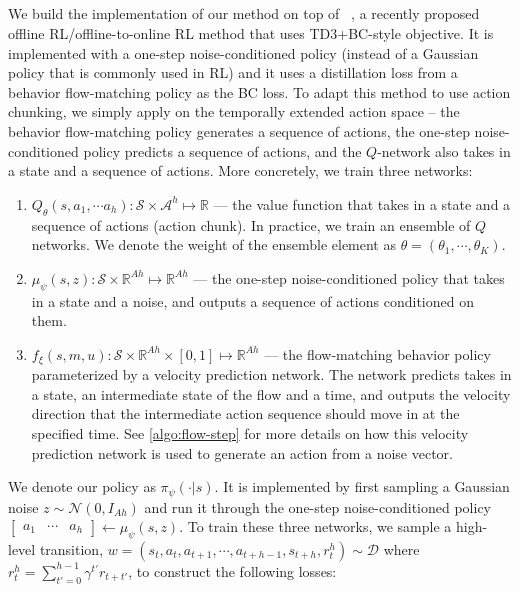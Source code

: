 \subsection{}
We build the implementation of our method on top of ~\citep{park2025flow}, a recently proposed offline RL/offline-to-online RL method that uses TD3+BC-style objective. It is implemented with a one-step noise-conditioned policy (instead of a Gaussian policy that is commonly used in RL) and it uses a distillation loss from a behavior flow-matching policy as the BC loss. To adapt this method to use action chunking, we simply apply  on the temporally extended action space -- the behavior flow-matching policy generates a sequence of actions, the one-step noise-conditioned policy predicts a sequence of actions, and the $Q$-network also takes in a state and a sequence of actions. More concretely, we train three networks:
\begin{enumerate}
    \item $Q_\theta(s, a_1, \cdots a_h): \mathcal{S}\times \mathcal{A}^h \mapsto \mathbb{R}$ --- the value function that takes in a state and a sequence of actions (action chunk). In practice, we train an ensemble of $Q$ networks. We denote the weight of the ensemble element as $\theta = (\theta_1, \cdots, \theta_K)$.
    \item $\mu_\psi(s, z): \mathcal{S}\times \mathbb{R}^{Ah} \mapsto \mathbb{R}^{Ah}$ --- the one-step noise-conditioned policy that takes in a state and a noise, and outputs a sequence of actions conditioned on them.
    \item $f_\xi(s, m, u): \mathcal{S} \times \mathbb{R}^{Ah} \times [0, 1] \mapsto \mathbb{R}^{Ah}$ --- the flow-matching behavior policy parameterized by a velocity prediction network. The network predicts takes in a state, an intermediate state of the flow and a time, and outputs the velocity direction that the intermediate action sequence should move in at the specified time. See \cref{algo:flow-step} for more details on how this velocity prediction network is used to generate an action from a noise vector.
\end{enumerate}
We denote our policy as $\pi_\psi(\cdot|s)$. It is implemented by first sampling a Gaussian noise $z \sim \mathcal{N}(0, I_{Ah})$ and run it through the one-step noise-conditioned policy $\begin{bmatrix} a_1 & \cdots & a_h \end{bmatrix} \leftarrow \mu_\psi(s, z)$. To train these three networks, we sample a high-level transition, $w = (s_t, a_t, a_{t+1}, \cdots, a_{t+h-1}, s_{t+h}, r^h_t) \sim \mathcal{D}$ where $r^h_t = \sum_{t'=0}^{h-1}\gamma^{t'}r_{t+t'}$, to construct the following losses:



